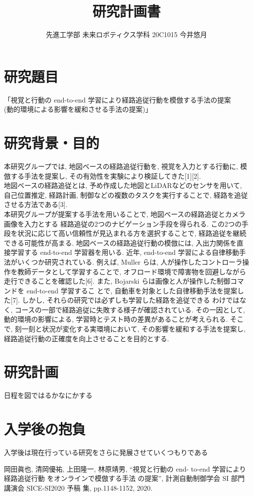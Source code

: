 \documentclass{jsarticle}
\begin{document}
\title{{\vspace*{-30mm}}{\huge 研究計画書}}
\author{\large 先進工学部 未来ロボティクス学科 20C1015 今井悠月}
\date{}
\maketitle




\section{研究題目}
「視覚と行動の end-to-end 学習により経路追従行動を模倣する手法の提案\\
\hspace{1zw}(動的環境による影響を緩和させる手法の提案)」

\section{研究背景・目的}
本研究グループでは, 地図ベースの経路追従行動を, 視覚を入力とする行動に, 模倣する手法を提案し, 
その有効性を実験により検証してきた[1][2].\\
地図ベースの経路追従とは, 予め作成した地図とLiDARなどのセンサを用いて, 
自己位置推定, 経路計画, 制御などの複数のタスクを実行することで, 経路を追従させる方法である[3].\\
本研究グループが提案する手法を用いることで, 地図ベースの経路追従とカメラ画像を入力とする
経路追従の2つのナビゲーション手段を得られる. 
この2つの手段を状況に応じて高い信頼性が見込まれる方を選択することで, 経路追従を継続できる可能性が高まる.
地図ベースの経路追従行動の模倣には, 入出力関係を直接学習する end-to-end 学習器を用いる.
近年, end-to-end 学習による自律移動手法がいくつか研究されている.
例えば, Muller らは, 人が操作したコントローラ操作を教師データとして学習することで, 
オフロード環境で障害物を回避しながら走行できることを確認した[6].
また, Bojarski らは画像と人が操作した制御コマンドを end-to-end 学習するこ
とで, 自動車を対象とした自律移動手法を提案した[7].
しかし, それらの研究では必ずしも学習した経路を追従できる
わけではなく, コースの一部で経路追従に失敗する様子が確認されている.
その一因として, 動的環境の影響による, 学習時とテスト時の差異があることが考えられる.
そこで, 刻一刻と状況が変化する実環境において, その影響を緩和する手法を提案し, 
経路追従行動の正確度を向上させることを目的とする.


\section{研究計画}
日程を図ではるかなにかする

\section{入学後の抱負}
入学後は現在行っている研究をさらに発展させていくつもりである


\begin{thebibliography}{99}

岡田眞也, 清岡優祐, 上田隆一, 林原靖男, “視覚と行動の end-
to-end 学習により経路追従行動 をオンラインで模倣する手法
の提案”, 計測自動制御学会 SI 部門講演会 SICE-SI2020 予稿
集, pp.1148-1152, 2020.

\end{thebibliography}
\end{document}
